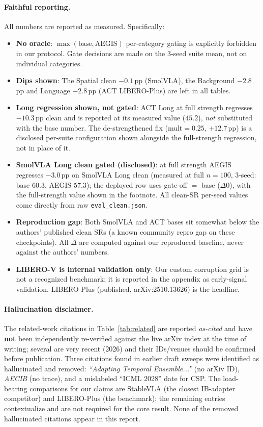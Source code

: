 \documentclass[11pt,a4paper]{article}
\begin{document}
\paragraph{Faithful reporting.}
All numbers are reported as measured. Specifically:
\begin{itemize}[nosep]
  \item \textbf{No oracle}: $\max(\text{base},\text{AEGIS})$ per-category gating is explicitly
        forbidden in our protocol. Gate decisions are made on the 3-seed suite mean, not on
        individual categories.
  \item \textbf{Dips shown}: The Spatial clean $-0.1$\,pp (SmolVLA), the Background $-2.8$\,pp
        and Language $-2.8$\,pp (ACT LIBERO-Plus) are left in all tables.
  \item \textbf{Long regression shown, not gated}: ACT Long at full strength regresses
        $-10.3$\,pp clean and is reported at its measured value ($45.2$), \emph{not} substituted
        with the base number. The de-strengthened fix (mult$=0.25$, $+12.7$\,pp) is a disclosed
        per-suite configuration shown alongside the full-strength regression, not in place of it.
  \item \textbf{SmolVLA Long clean gated (disclosed)}: at full strength AEGIS regresses
        $-3.0$\,pp on SmolVLA Long clean (measured at full $n=100$, 3-seed: base $60.3$,
        AEGIS $57.3$); the deployed row uses gate-off $=$ base ($\Delta 0$), with the
        full-strength value shown in the footnote. All clean-SR per-seed values come directly
        from raw \texttt{eval\_clean.json}.
  \item \textbf{Reproduction gap}: Both SmolVLA and ACT bases sit somewhat below the authors'
        published clean SRs (a known community repro gap on these checkpoints). All $\Delta$
        are computed against our reproduced baseline, never against the authors' numbers.
  \item \textbf{LIBERO-V is internal validation only}: Our custom corruption grid is not a
        recognized benchmark; it is reported in the appendix as early-signal validation.
        LIBERO-Plus (published, arXiv:2510.13626) is the headline.
\end{itemize}

\paragraph{Hallucination disclaimer.}
The related-work citations in Table~\ref{tab:related} are reported \emph{as-cited} and have
\textbf{not} been independently re-verified against the live arXiv index at the time of writing;
several are very recent (2026) and their IDs/venues should be confirmed before publication.
Three citations found in earlier draft sweeps were identified as hallucinated and removed:
\textit{``Adapting Temporal Ensemble...''} (no arXiv ID), \textit{AECIB} (no trace), and
a mislabeled ``ICML 2028'' date for CSP. The load-bearing comparisons for our claims are
StableVLA (the closest IB-adapter competitor) and LIBERO-Plus (the benchmark); the remaining
entries contextualize and are not required for the core result. None of the removed hallucinated
citations appear in this report.
\end{document}
